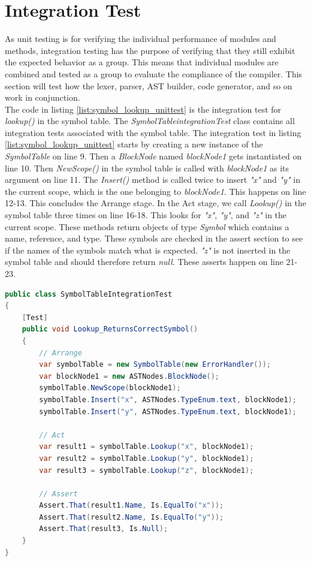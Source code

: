 \section{Integration Test} \label{sec:intergationTest}
As unit testing is for verifying the individual performance of modules and methods, integration testing has the purpose of verifying that they still exhibit the expected behavior as a group. This means that individual modules are combined and tested as a group to evaluate the compliance of the compiler. This section will test how the lexer, parser, AST builder, code generator, and so on work in conjunction.\\

The code in listing \ref{list:symbol_lookup_unittest} is the integration test for \textit{lookup()} in the symbol table. The \textit{SymbolTableintegrationTest} class contains all integration tests associated with the symbol table. The integration test in listing \ref{list:symbol_lookup_unittest} starts by creating a new instance of the \textit{SymbolTable} on line 9. Then a \textit{BlockNode} named \textit{blockNode1} gets instantiated on line 10. Then \textit{NewScope()} in the symbol table is called with \textit{blockNode1} as its argument on line 11. The \textit{Insert()} method is called twice to insert \textit{"x"} and \textit{"y"} in the current scope, which is the one belonging to \textit{blockNode1}. This happens on line 12-13. This concludes the Arrange stage. In the Act stage, we call \textit{Lookup()} in the symbol table three times on line 16-18. This looks for \textit{"x"}, \textit{"y"}, and \textit{"z"} in the current scope. These methods return objects of type \textit{Symbol} which contains a name, reference, and type. These symbols are checked in the assert section to see if the names of the symbols match what is expected. \textit{"z"} is not inserted in the symbol table and should therefore return \textit{null}. These asserts happen on line 21-23.\\

\begin{lstlisting}[language = csharp, firstnumber=3, label={list:symbol_lookup_unittest}, caption=Integration test of the lookup method from the symbol table - PEAKCompilerTesting / SymbolTableIntegrationTest.cs]
public class SymbolTableIntegrationTest
{
    [Test]
    public void Lookup_ReturnsCorrectSymbol()
    {
        // Arrange
        var symbolTable = new SymbolTable(new ErrorHandler());
        var blockNode1 = new ASTNodes.BlockNode();
        symbolTable.NewScope(blockNode1);
        symbolTable.Insert("x", ASTNodes.TypeEnum.text, blockNode1);
        symbolTable.Insert("y", ASTNodes.TypeEnum.text, blockNode1);
        
        // Act
        var result1 = symbolTable.Lookup("x", blockNode1);
        var result2 = symbolTable.Lookup("y", blockNode1);
        var result3 = symbolTable.Lookup("z", blockNode1);

        // Assert
        Assert.That(result1.Name, Is.EqualTo("x"));
        Assert.That(result2.Name, Is.EqualTo("y"));
        Assert.That(result3, Is.Null);
    }
}
\end{lstlisting}

